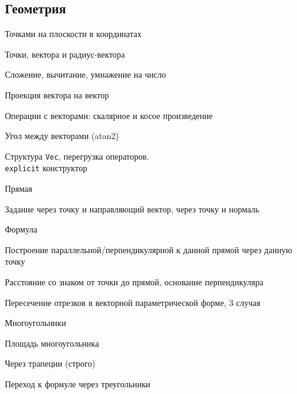 \documentclass[a4paper,12pt]{article}
\begin{document}
\begin{multicols}{2}
  \section{Геометрия}
    \begin{compactenum}

    \item{Точками на плоскости в координатах}
    \begin{compactenum}
      \item{Точки, вектора и радиус-вектора}
      \item{Сложение, вычитание, умнажение на число}
      \item{Проекция вектора на вектор}
      \item{Операции с векторами: скалярное и косое произведение}
      \item{Угол между векторами (atan2)}
    \end{compactenum}

    \item{Структура \texttt{Vec}, перегрузка операторов.\\ \texttt{explicit} конструктор}
     
    \item{Прямая}
    \begin{compactenum}
      \item{Задание через точку и направляющий вектор, через точку и нормаль}
      \begin{compactenum}
        \item{Формула}
        \item{Построение параллельной/перпендикулярной к данной прямой через данную точку}
      \end{compactenum}
      \item{Расстояние со знаком от точки до прямой, основание перпендикуляра}
    \end{compactenum}

    \item{Пересечение отрезков в векторной параметрической форме, 3 случая}

    \item{Многоугольники}
    \begin{compactenum}
      \item{Площадь многоугольника}
      \begin{compactenum}
        \item{Через трапеции (строго)}
        \item{Переход к формуле через треугольники}
      \end{compactenum}


\end{compactenum}
\end{compactenum}
\end{multicols}
\end{document}
